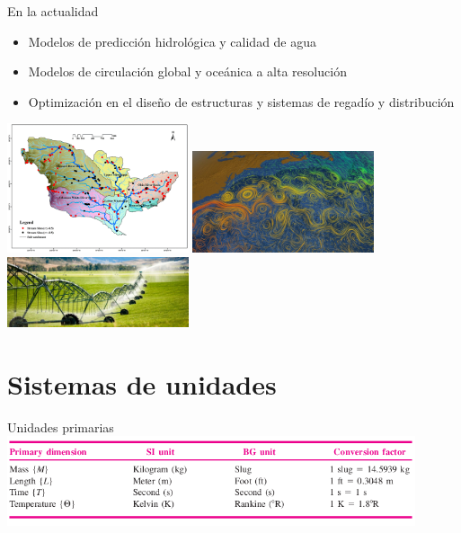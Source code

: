 \documentclass [xcolor=svgnames, t] {beamer}
\begin{document}
\begin{frame}{En la actualidad}
\vspace{-0.4cm}
\begin{exampleblock}{}
\begin{itemize}
\item Modelos de predicción hidrológica y calidad de agua
\item Modelos de circulación global y oceánica a alta resolución
\item Optimización en el diseño de estructuras y sistemas de regadío y distribución
\end{itemize}
\end{exampleblock}
\begin{center}
\includegraphics[width=0.4\textwidth]{rivba}
\includegraphics[width=0.4\textwidth]{oceanc}
\includegraphics[width=0.4\textwidth]{irriga}
\end{center}
\end{frame}



\section{Sistemas de unidades}

\begin{frame}{Unidades primarias}
\centering
\includegraphics[width=12cm]{primu}
\end{frame}
\end{document}

